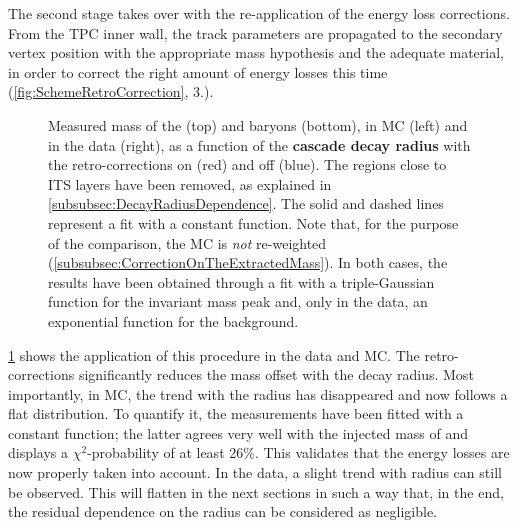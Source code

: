 The second stage takes over with the re-application of the energy loss corrections. From the TPC inner wall, the track parameters are propagated to the secondary vertex position with the appropriate mass hypothesis and the adequate material, in order to correct the right amount of energy losses this time (\fig\ref{fig:SchemeRetroCorrection}, 3.).\\

\begin{figure}[p]
\hspace*{-2.cm}
\hspace*{-2.cm}
\caption{Measured mass of the \rmXi (top) and \rmOmega baryons (bottom), in MC (left) and in the data (right), as a function of the \textbf{cascade decay radius} with the retro-corrections on (red) and off (blue). The regions close to ITS layers have been removed, as explained in \Sec\ref{subsubsec:DecayRadiusDependence}. The solid and dashed lines represent a fit with a constant function. Note that, for the purpose of the comparison, the MC is \textit{not} re-weighted (\Sec\ref{subsubsec:CorrectionOnTheExtractedMass}). In both cases, the results have been obtained through a fit with a triple-Gaussian function for the invariant mass peak and, only in the data, an exponential function for the background.}
	\label{fig:MassVsRadiusAfterRetrocorrection}
\end{figure}

\Fig\ref{fig:MassVsRadiusAfterRetrocorrection} shows the application of this procedure in the data and MC. The retro-corrections significantly reduces the mass offset with the decay radius. Most importantly, in MC, the trend with the radius has disappeared and now follows a flat distribution. To quantify it, the measurements have been fitted with a constant function; the latter agrees very well with the injected mass of \rmXi and displays a $\chi^{2}$-probability of at least 26\%. This validates that the energy losses are now properly taken into account. In the data, a slight trend with radius can still be observed. This will flatten in the next sections in such a way that, in the end, the residual dependence on the radius can be considered as negligible. 


